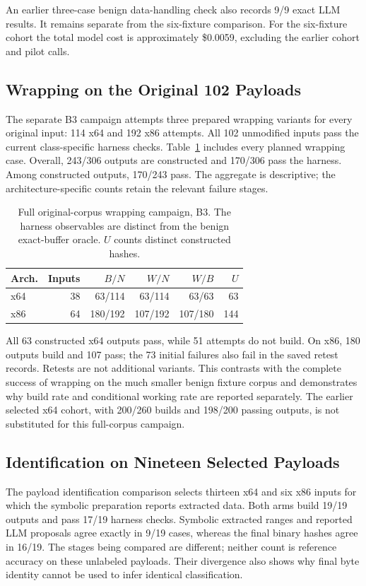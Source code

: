 An earlier three-case benign data-handling check also records 9/9
exact LLM results. It remains separate from the six-fixture comparison.
For the six-fixture cohort the total model cost is approximately
\$0.0059, excluding the earlier cohort and pilot calls.

\subsection{Wrapping on the Original 102 Payloads}
The separate B3 campaign attempts three prepared wrapping variants
for every original input: 114 x64 and 192 x86 attempts. All 102
unmodified inputs pass the current class-specific harness checks.
Table~\ref{tab:new_wrap_full} includes every planned wrapping case.
Overall, 243/306 outputs are constructed and 170/306 pass the harness.
Among constructed outputs, 170/243 pass. The aggregate is descriptive;
the architecture-specific counts retain the relevant failure stages.

\begin{table}[t]
\caption{Full original-corpus wrapping campaign, B3. The harness
observables are distinct from the benign exact-buffer oracle.
$U$ counts distinct constructed hashes.}
\label{tab:new_wrap_full}
\centering\small
\begin{tabular}{@{}lrrrrr@{}}
\toprule
Arch. & Inputs & $B/N$ & $W/N$ & $W/B$ & $U$ \\
\midrule
x64 & 38 & 63/114 & 63/114 & 63/63 & 63 \\
x86 & 64 & 180/192 & 107/192 & 107/180 & 144 \\
\bottomrule
\end{tabular}
\end{table}

All 63 constructed x64 outputs pass, while 51 attempts do not build.
On x86, 180 outputs build and 107 pass; the 73 initial failures also
fail in the saved retest records. Retests are not additional variants.
This contrasts with the complete success of wrapping on the much
smaller benign fixture corpus and demonstrates why build rate and
conditional working rate are reported separately. The earlier selected
x64 cohort, with 200/260 builds and 198/200 passing outputs, is not
substituted for this full-corpus campaign.

\subsection{Identification on Nineteen Selected Payloads}
The payload identification comparison selects thirteen x64 and six
x86 inputs for which the symbolic preparation reports extracted data.
Both arms build 19/19 outputs and pass 17/19 harness checks. Symbolic
extracted ranges and reported LLM proposals agree exactly in 9/19
cases, whereas the final binary hashes agree in 16/19. The stages
being compared are different; neither count is reference accuracy
on these unlabeled payloads. Their divergence also shows why final
byte identity cannot be used to infer identical classification.

